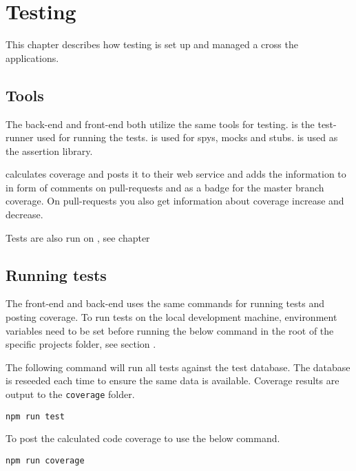 \chapter{Testing}
This chapter describes how testing is set up and managed a cross the applications.

\section{Tools}
The back-end and front-end both utilize the same tools for testing.
 is the test-runner used for running the tests.
 is used for spys, mocks and stubs.  is used as the assertion library.

 calculates coverage and  posts it to their web service and adds the information to  in form of comments on pull-requests and as a badge for the master branch coverage.
On pull-requests you also get information about coverage increase and decrease.

Tests are also run on , see chapter 

\section{Running tests}
The front-end and back-end uses the same commands for running tests and posting coverage.
To run tests on the local development machine, environment variables need to be set before running the below command in the root of the specific projects folder, see section .

The following command will run all tests against the test database.
The database is reseeded each time to ensure the same data is available. 
Coverage results are output to the \verb+coverage+ folder.

\verb+npm run test+

To post the calculated code coverage to  use the below command.

\verb+npm run coverage+
